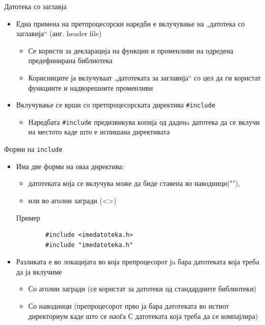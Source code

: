 \begin{frame}{Датотека со заглавја}
\begin{itemize}
	\item Една примена на претпроцесорски наредби е вклучување на „датотека со заглавија“ (анг. header file)
	\begin{itemize}
		\item Се користи за декларација на функции и променливи на одредена предефинирана библиотека
		\item Корисниците ја вклучуваат „датотеката за заглавија“ со цел да ги користат функциите и надворешните променливи
	\end{itemize}
	\item Вклучување се врши со претпроцесорската директива \texttt{\#include}
	\begin{itemize}
		\item Наредбата \texttt{\#include} предизвикува копија од даденa датотека да се вклучи на местото каде што е испишана директивата
	\end{itemize}
\end{itemize}
\end{frame}

\begin{frame}[fragile]{Форми на \texttt{include}}
\begin{itemize}
	\item Има две форми на оваа директива:
	\begin{itemize}
		\item датотеката која се вклучува може да биде ставена во наводници(""), 
		\item или во аголни загради (<>)
	\end{itemize}
	\begin{exampleblock}{Пример}
		\begin{verbatim}
		#include <imedatoteka.h>
		#include "imedatoteka.h"
		\end{verbatim}
	\end{exampleblock}
	\item Разликата е во локацијата во која препроцесорот јa бара датотеката која треба да ја вклучиме
	\begin{itemize}
		\item Со аголни загради (се користат за датотеки од стандардните библиотеки) 
		\item Со наводници (препроцесорот прво ја бара датотеката во истиот директориум каде што се наоѓа С датотеката која треба да се компајлира)
	\end{itemize}
\end{itemize}

\end{frame}

